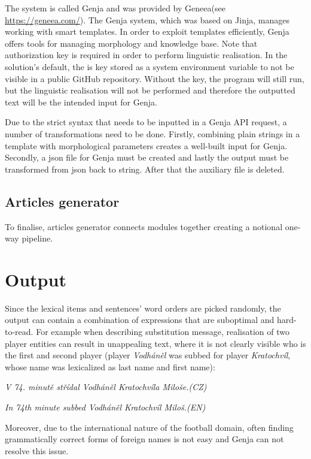 The system is called Genja and was provided by Geneea(see \url{https://geneea.com/}). The Genja system, which was based on Jinja, manages working with smart templates. In order to exploit templates efficiently, Genja offers tools for managing morphology and knowledge base. Note that authorization key is required in order to perform linguistic realisation. In the solution's default, the is key stored as a system environment variable to not be visible in a public GitHub repository. Without the key, the program will still run, but the linguistic realisation will not be performed and therefore the outputted text will be the intended input for Genja.

Due to the strict syntax that needs to be inputted in a Genja API request, a number of transformations need to be done. Firstly, combining plain strings in a template with morphological parameters creates a well-built input for Genja. Secondly, a json file for Genja must be created and lastly the output must be transformed from json back to string. After that the auxiliary file is deleted.

\subsection{Articles generator}
To finalise, articles generator connects modules together creating a notional one-way pipeline. 

\section{Output}
Since the lexical items and sentences' word orders are picked randomly, the output can contain a combination of expressions that are suboptimal and hard-to-read. For example when describing substitution message, realisation of two player entities can result in unappealing text, where it is not clearly visible who is the first and second player (player \textit{Vodháněl} was subbed for player \textit{Kratochvíl}, whose name was lexicalized as last name and first name):
\begin{center}
	\textit{V 74. minutě střídal Vodháněl Kratochvíla Miloše.(CZ)}
\end{center}
\begin{center}
	\textit{In 74th minute subbed Vodháněl Kratochvíl Miloš.(EN)}
\end{center}
Moreover, due to the international nature of the football domain, often finding grammatically correct forms of foreign names is not easy and Genja can not resolve this issue. 


